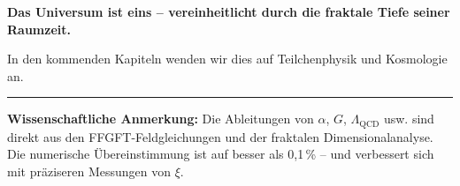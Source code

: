 	\textbf{Das Universum ist eins – vereinheitlicht durch die fraktale Tiefe seiner Raumzeit.}
	
	In den kommenden Kapiteln wenden wir dies auf Teilchenphysik und Kosmologie an.
	
	\vspace{1cm}
	\hrule
	\vspace{0.5cm}
	\noindent\textbf{Wissenschaftliche Anmerkung:} Die Ableitungen von \(\alpha\), \(G\), \(\Lambda_{\text{QCD}}\) usw. sind direkt aus den FFGFT-Feldgleichungen und der fraktalen Dimensionalanalyse. Die numerische Übereinstimmung ist auf besser als 0{,}1\,\% – und verbessert sich mit präziseren Messungen von \(\xi\).




